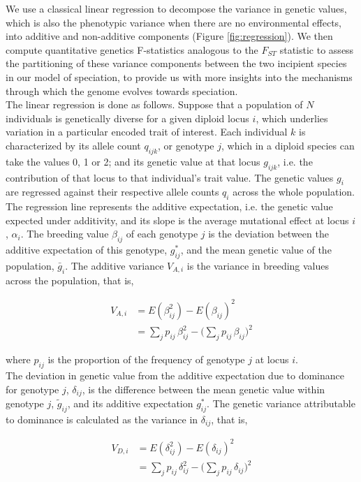 \documentclass[]{article}
\begin{document}
We use a classical linear regression to decompose the variance in genetic values, which is also the phenotypic variance when there are no environmental effects, into additive and non-additive components (Figure \ref{fig:regression}). We then compute quantitative genetics F-statistics analogous to the $F_{ST}$ statistic to assess the partitioning of these variance components between the two incipient species in our model of speciation, to provide us with more insights into the mechanisms through which the genome evolves towards speciation.\\

The linear regression is done as follows. Suppose that a population of $N$ individuals is genetically diverse for a given diploid locus $i$, which underlies variation in a particular encoded trait of interest. Each individual $k$ is characterized by its allele count $q_{ijk}$, or genotype $j$, which in a diploid species can take the values 0, 1 or 2; and its genetic value at that locus $g_{ijk}$, i.e. the contribution of that locus to that individual's trait value. The genetic values $g_i$ are regressed against their respective allele counts $q_i$ across the whole population. The regression line represents the additive expectation, i.e. the genetic value expected under additivity, and its slope is the average mutational effect at locus $i$, $\alpha_i$. The breeding value $\beta_{ij}$ of each genotype $j$ is the deviation between the additive expectation of this genotype, $g^*_{ij}$, and the mean genetic value of the population, $\bar{g}_i$. The additive variance $V_{A,i}$ is the variance in breeding values across the population, that is,

\begin{align} 
V_{A,i} &= E(\beta_{ij}^2) - E(\beta_{ij})^2\\
&= \sum_j p_{ij} \, \beta_{ij}^2 - \bigg( \sum_j p_{ij} \, \beta_{ij} \bigg)^2
\end{align}

where $p_{ij}$ is the proportion of the frequency of genotype $j$ at locus $i$.\\

The deviation in genetic value from the additive expectation due to dominance for genotype $j$, $\delta_{ij}$, is the difference between the mean genetic value within genotype $j$, $\tilde{g}_{ij}$, and its additive expectation $g^*_{ij}$. The genetic variance attributable to dominance is calculated as the variance in $\delta_{ij}$, that is,

\begin{align}
V_{D,i} &= E(\delta_{ij}^2) - E(\delta_{ij})^2\\
&= \sum_j p_{ij} \, \delta_{ij}^2 - \bigg( \sum_j p_{ij} \, \delta_{ij} \bigg)^2
\end{align}
\end{document}
